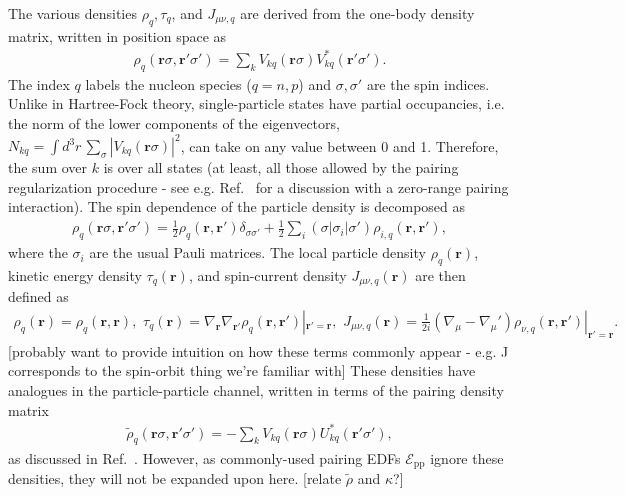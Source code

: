 \documentclass[../thesis.tex]{subfiles}
\begin{document}
The various densities $\rho_q,\tau_q$, and $J_{\mu\nu,q}$ are derived from the one-body density matrix, written in position space as
\begin{align}
	\rho_q(\bm{r}\sigma,\bm{r}'\sigma')=\sum_kV_{kq}(\bm{r}\sigma)V_{kq}^*(\bm{r}'\sigma').
\end{align}
The index $q$ labels the nucleon species ($q=n,p$) and $\sigma,\sigma'$ are the spin indices. Unlike in Hartree-Fock theory, single-particle states have partial occupancies, i.e. the norm of the lower components of the eigenvectors, $N_{kq}=\int d^3r\,\sum_\sigma|V_{kq}(\bm{r}\sigma)|^2$, can take on any value between 0 and 1. Therefore, the sum over $k$ is over all states (at least, all those allowed by the pairing regularization procedure - see e.g. Ref.~\cite{Stoitsov2005} for a discussion with a zero-range pairing interaction). The spin dependence of the particle density is decomposed as
\begin{align}
	\rho_q(\bm{r}\sigma,\bm{r}'\sigma')=\frac{1}{2}\rho_q(\bm{r},\bm{r}')\delta_{\sigma\sigma'}+\frac{1}{2}\sum_i(\sigma|\sigma_i|\sigma')\rho_{i,q}(\bm{r},\bm{r}'),
\end{align}
where the $\sigma_i$ are the usual Pauli matrices. The local particle density $\rho_q(\bm{r})$, kinetic energy density $\tau_q(\bm{r})$, and spin-current density $J_{\mu\nu,q}(\bm{r})$ are then defined as
\begin{align}
	\rho_q(\bm{r})=\rho_q(\bm{r},\bm{r}),\,\, \tau_q(\bm{r})=\nabla_{\bm{r}}\nabla_{\bm{r}'}\rho_q(\bm{r},\bm{r}')|_{\bm{r}'=\bm{r}},\,\, J_{\mu\nu,q}(\bm{r})=\frac{1}{2i}(\nabla_\mu-\nabla_\mu')\rho_{\nu,q}(\bm{r},\bm{r}')|_{\bm{r}'=\bm{r}}.
\end{align}
[probably want to provide intuition on how these terms commonly appear - e.g. J corresponds to the spin-orbit thing we're familiar with] These densities have analogues in the particle-particle channel, written in terms of the pairing density matrix
\begin{align}
	\tilde{\rho}_q(\bm{r}\sigma,\bm{r}'\sigma')=-\sum_k V_{kq}(\bm{r}\sigma)U_{kq}^*(\bm{r}'\sigma'),
\end{align}
as discussed in Ref.~\cite{Dobaczewski1984}. However, as commonly-used pairing EDFs $\mathcal{E}_\textrm{pp}$ ignore these densities, they will not be expanded upon here. [relate $\tilde{\rho}$ and $\kappa$?]
\end{document}
